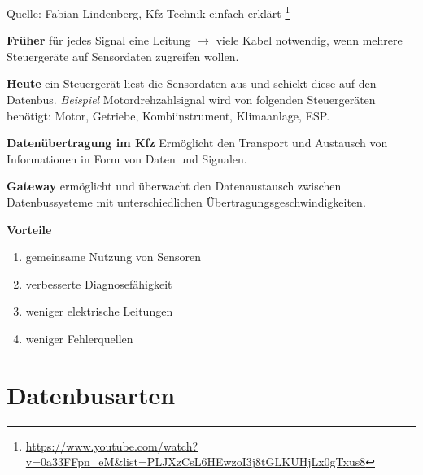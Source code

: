 Quelle: Fabian Lindenberg, Kfz-Technik einfach erklärt \footnote{\url{https://www.youtube.com/watch?v=0a33FFpn_eM\&list=PLJXzCsL6HEwzoI3j8tGLKUHjLx0gTxus8}}

\textbf{Früher} für jedes Signal eine Leitung $\to$ viele Kabel
notwendig, wenn mehrere Steuergeräte auf Sensordaten zugreifen wollen.

\textbf{Heute} ein Steuergerät liest die Sensordaten aus und schickt
diese auf den Datenbus. \emph{Beispiel} Motordrehzahlsignal wird von
folgenden Steuergeräten benötigt: Motor, Getriebe, Kombiinstrument,
Klimaanlage, ESP.

\textbf{Datenübertragung im Kfz} Ermöglicht den Transport und Austausch
von Informationen in Form von Daten und Signalen.

\textbf{Gateway} ermöglicht und überwacht den Datenaustausch zwischen
Datenbussysteme mit unterschiedlichen Übertragungsgeschwindigkeiten.

\textbf{Vorteile}

\begin{enumerate}
\item
  gemeinsame Nutzung von Sensoren
\item
  verbesserte Diagnosefähigkeit
\item
  weniger elektrische Leitungen
\item
  weniger Fehlerquellen
\end{enumerate}

\section{Datenbusarten}\label{datenbusarten}

